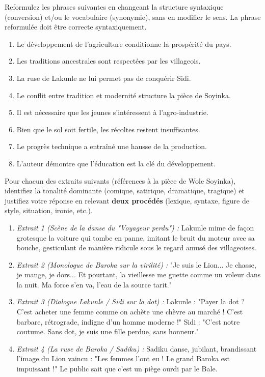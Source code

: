 \documentclass[11pt]{article}
\newcommand{\cle}[1]{{\popxbold\color{popdark}#1}}
\begin{document}
\begin{exercice}
Reformulez les phrases suivantes en changeant la structure syntaxique (conversion) et/ou le vocabulaire (synonymie), sans en modifier le sens. La phrase reformulée doit être correcte syntaxiquement.

\begin{enumerate}
    \item Le développement de l'agriculture conditionne la prospérité du pays.
    \item Les traditions ancestrales sont respectées par les villageois.
    \item La ruse de Lakunle ne lui permet pas de conquérir Sidi.
    \item Le conflit entre tradition et modernité structure la pièce de Soyinka.
    \item Il est nécessaire que les jeunes s'intéressent à l'agro-industrie.
    \item Bien que le sol soit fertile, les récoltes restent insuffisantes.
    \item Le progrès technique a entraîné une hausse de la production.
    \item L'auteur démontre que l'éducation est la clé du développement.
\end{enumerate}
\end{exercice}

\begin{exercice}
Pour chacun des extraits suivants (références à la pièce de Wole Soyinka), identifiez la \cle{tonalité} dominante (comique, satirique, dramatique, tragique) et justifiez votre réponse en relevant \textbf{deux procédés} (lexique, syntaxe, figure de style, situation, ironie, etc.).

\begin{enumerate}
    \item \textit{Extrait 1 (Scène de la danse du "Voyageur perdu") :} Lakunle mime de façon grotesque la voiture qui tombe en panne, imitant le bruit du moteur avec sa bouche, gesticulant de manière ridicule sous le regard amusé des villageoises.
    \item \textit{Extrait 2 (Monologue de Baroka sur la virilité) :} "Je suis le Lion... Je chasse, je mange, je dors... Et pourtant, la vieillesse me guette comme un voleur dans la nuit. Ma force s'en va, l'eau de la source tarit."
    \item \textit{Extrait 3 (Dialogue Lakunle / Sidi sur la dot) :} Lakunle : "Payer la dot ? C'est acheter une femme comme on achète une chèvre au marché ! C'est barbare, rétrograde, indigne d'un homme moderne !" Sidi : "C'est notre coutume. Sans dot, je suis une fille perdue, sans honneur."
    \item \textit{Extrait 4 (La ruse de Baroka / Sadiku) :} Sadiku danse, jubilant, brandissant l'image du Lion vaincu : "Les femmes l'ont eu ! Le grand Baroka est impuissant !" Le public sait que c'est un piège ourdi par le Bale.
\end{enumerate}
\end{exercice}
\end{document}
